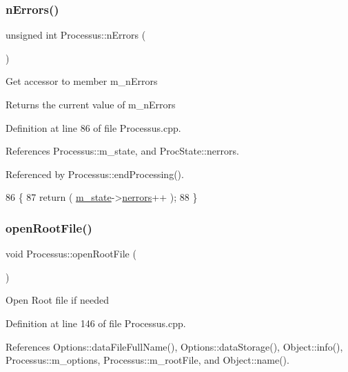 \subsubsection{\texorpdfstring{n\+Errors()}{nErrors()}}
{\footnotesize\ttfamily unsigned int Processus\+::n\+Errors (\begin{DoxyParamCaption}{ }\end{DoxyParamCaption})\hspace{0.3cm}{\ttfamily [inherited]}}

Get accessor to member m\+\_\+n\+Errors \begin{DoxyReturn}{Returns}
the current value of m\+\_\+n\+Errors 
\end{DoxyReturn}


Definition at line 86 of file Processus.\+cpp.



References Processus\+::m\+\_\+state, and Proc\+State\+::nerrors.



Referenced by Processus\+::end\+Processing().


\begin{DoxyCode}
86                                 \{
87   \textcolor{keywordflow}{return} ( \hyperlink{classProcessus_ab3539eee42891ceae0baf4395ae7fb61}{m\_state}->\hyperlink{structProcState_a51a0f54ba62b07e07ac8518c5f32828d}{nerrors}++ );
88 \}
\end{DoxyCode}
\mbox{\label{classProcessus_aacf6812880c1d1a2bf14a4a39458f443}} 
\subsubsection{\texorpdfstring{open\+Root\+File()}{openRootFile()}}
{\footnotesize\ttfamily void Processus\+::open\+Root\+File (\begin{DoxyParamCaption}{ }\end{DoxyParamCaption})\hspace{0.3cm}{\ttfamily [inherited]}}

Open Root file if needed 

Definition at line 146 of file Processus.\+cpp.



References Options\+::data\+File\+Full\+Name(), Options\+::data\+Storage(), Object\+::info(), Processus\+::m\+\_\+options, Processus\+::m\+\_\+root\+File, and Object\+::name().



